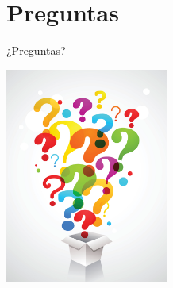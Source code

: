 \documentclass[aspectratio=169]{beamer}
\begin{document}
\section*{Preguntas}
\begin{frame}{¿Preguntas?}
	\begin{center}
		\includegraphics[width=0.4\textwidth]{imgs/cmn/preguntas.pdf}
	\end{center}
\end{frame}
\end{document}
